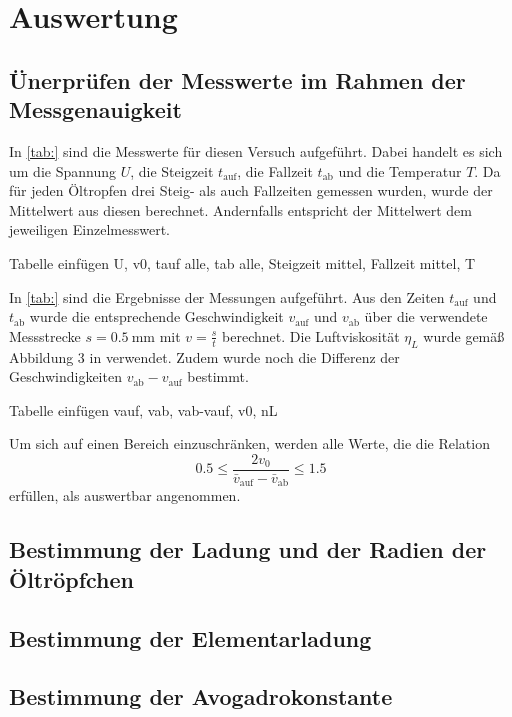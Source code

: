 \section{Auswertung}
\label{sec:Auswertung}

\subsection{Ünerprüfen der Messwerte im Rahmen der Messgenauigkeit}
In \ref{tab:} sind die Messwerte für diesen Versuch aufgeführt. Dabei handelt es sich um die Spannung $U$, 
die Steigzeit $t_{\text{auf}}$, die Fallzeit $t_{\text{ab}}$ und die Temperatur $T$. Da für jeden Öltropfen drei Steig- als auch 
Fallzeiten gemessen wurden, wurde der Mittelwert aus diesen berechnet. Andernfalls entspricht der Mittelwert dem jeweiligen 
Einzelmesswert.

Tabelle einfügen U, v0, tauf alle, tab alle, Steigzeit mittel, Fallzeit mittel, T

In \ref{tab:} sind die Ergebnisse der Messungen aufgeführt. Aus den Zeiten $t_{\text{auf}}$ und $t_{\text{ab}}$ 
wurde die entsprechende Geschwindigkeit $v_{\text{auf}}$ und $v_{\text{ab}}$ über die verwendete Messstrecke $s = \SI{0.5}{\mm}$
mit $v=\frac{s}{t}$ berechnet. Die Luftviskosität $\eta_{L}$ wurde gemäß Abbildung 3 in \cite{1} verwendet. Zudem wurde noch die  
Differenz der Geschwindigkeiten $v_{\text{ab}} - v_{\text{auf}}$ bestimmt.

Tabelle einfügen vauf, vab, vab-vauf, v0, nL

Um sich auf einen Bereich einzuschränken, werden alle Werte, die die Relation 
\begin{equation*}
    0.5\leq \frac{2v_0}{\bar{v}_{\text{auf}}-\bar{v}_{\text{ab}}}\leq 1.5
\end{equation*}
erfüllen, als auswertbar angenommen.

\subsection{Bestimmung der Ladung und der Radien der Öltröpfchen}

\subsection{Bestimmung der Elementarladung}

\subsection{Bestimmung der Avogadrokonstante}




